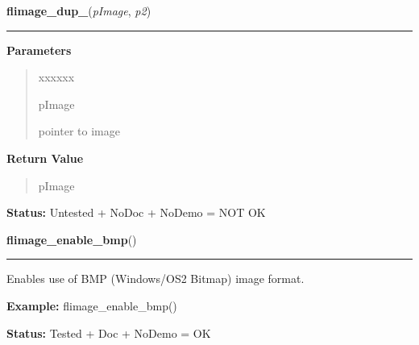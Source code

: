 \hspace{.8\funcindent}\begin{boxedminipage}{\funcwidth}

    \raggedright \textbf{flimage\_dup\_}(\textit{pImage}, \textit{p2})

    \vspace{-1.5ex}

    \rule{\textwidth}{0.5\fboxrule}
\setlength{\parskip}{2ex}
\setlength{\parskip}{1ex}
      \textbf{Parameters}
      \vspace{-1ex}

      \begin{quote}
        \begin{Ventry}{xxxxxx}

          \item[pImage]

          pointer to image

        \end{Ventry}

      \end{quote}

      \textbf{Return Value}
    \vspace{-1ex}

      \begin{quote}
      pImage

      \end{quote}

\textbf{Status:} Untested + NoDoc + NoDemo = NOT OK



    \end{boxedminipage}

    \label{xformslib:flflimage:flimage_enable_bmp}

    \vspace{0.5ex}

\hspace{.8\funcindent}\begin{boxedminipage}{\funcwidth}

    \raggedright \textbf{flimage\_enable\_bmp}()

    \vspace{-1.5ex}

    \rule{\textwidth}{0.5\fboxrule}
\setlength{\parskip}{2ex}
    Enables use of BMP (Windows/OS2 Bitmap) image format.

\setlength{\parskip}{1ex}
\textbf{Example:} flimage\_enable\_bmp()



\textbf{Status:} Tested + Doc + NoDemo = OK



    \end{boxedminipage}

